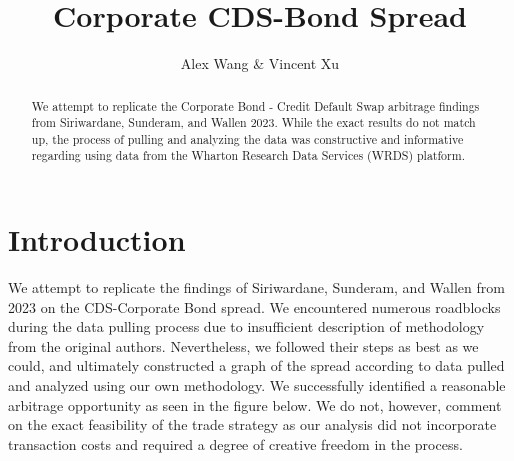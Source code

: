 \documentclass[12pt]{article}
\begin{document}
\title{
Corporate CDS-Bond Spread
}

\author{
Alex Wang \& Vincent Xu
}
\begin{titlepage}
% 
\maketitle


\doublespacing
\begin{abstract}
We attempt to replicate the Corporate Bond - Credit Default Swap arbitrage findings from 
Siriwardane, Sunderam, and Wallen 2023. While the exact results do not match up,
the process of pulling and analyzing the data was constructive and informative
regarding using data from the Wharton Research Data Services (WRDS) platform.

\end{abstract}


\end{titlepage}

\doublespacing
\section{Introduction}

We attempt to replicate the findings of Siriwardane, Sunderam, and Wallen from 2023
on the CDS-Corporate Bond spread. We encountered numerous roadblocks during the
data pulling process due to insufficient description of methodology from the
original authors. Nevertheless, we followed their steps as best as we could, and
ultimately constructed a graph of the spread according to data pulled and analyzed
using our own methodology. We successfully identified a reasonable arbitrage
opportunity as seen in the figure below. We do not, however, comment on the exact 
feasibility of the trade strategy as our analysis did not incorporate transaction
costs and required a degree of creative freedom in the process.
\end{document}
